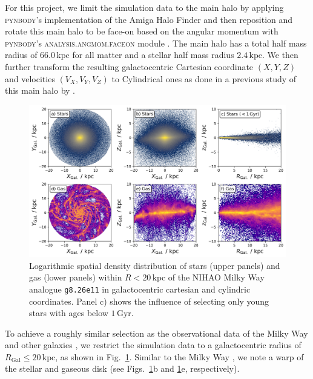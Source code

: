 \documentclass[fleqn,usenatbib]{mnras}
\begin{document}
For this project, we limit the simulation data to the main halo by applying \textsc{pynbody}'s implementation of the Amiga Halo Finder \citep{Knollman2009} and then reposition and rotate this main halo to be face-on based on the angular momentum with \textsc{pynbody}'s \textsc{analysis.angmom.faceon} module \citep{pynbody}. The main halo has a total half mass radius of $66.0\,\mathrm{kpc}$ for all matter and a stellar half mass radius $2.4\,\mathrm{kpc}$. We then further transform the resulting galactocentric Cartesian coordinate $(X,Y,Z)$ and velocities $(V_X,V_Y,V_Z)$ to Cylindrical ones as done in a previous study of this main halo by \citet{Buder2024}.

\begin{figure}
    \centering
    \includegraphics[width=\textwidth]{figures/stars_and_gas_overview.png}
    \caption{Logarithmic spatial density distribution of stars (upper panels) and gas (lower panels) within $R < 20\,\mathrm{kpc}$ of the NIHAO Milky Way analogue \texttt{g8.26e11} in galactocentric cartesian and cylindric coordinates. Panel c) shows the influence of selecting only young stars with ages below $1\,\mathrm{Gyr}$.}
    \label{fig:stars_and_gas_overview}
\end{figure}

To achieve a roughly similar selection as the observational data of the Milky Way \citep{Genovali2014} and other galaxies \citep[e.g.][]{Chen2023}, we restrict the simulation data to a galactocentric radius of $R_\mathrm{Gal} \leq 20\,\mathrm{kpc}$, as shown in Fig.~\ref{fig:stars_and_gas_overview}. Similar to the Milky Way \citep{Poggio2018, Lemasle2022}, we note a warp of the stellar and gaseous disk (see Figs.~\ref{fig:stars_and_gas_overview}b and \ref{fig:stars_and_gas_overview}e, respectively).
\end{document}
